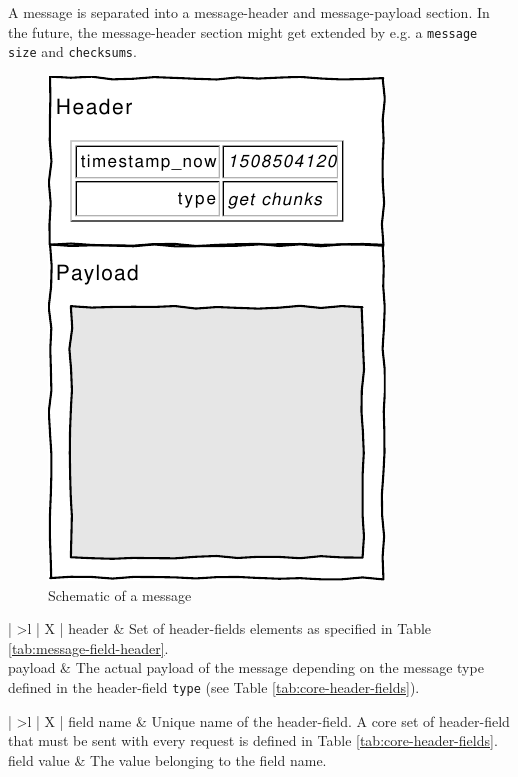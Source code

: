 A \gls{message} is separated into a \gls{message-header} and \gls{message-payload} section. In the future, the \gls{message-header} section might get extended by e.g. a \texttt{message size} and \texttt{checksums}.

\begin{figure}[h]
    \centering
    \includegraphics[width=0.3\linewidth]{resources/message_schematic}
    \caption[\Gls{message} Schematic]{Schematic of a \gls{message}}
    \label{fig:messageschematic}
\end{figure}

\begin{table}[H]
    \begin{tabu}{| >{\ttfamily}l | X |}
        \hline
        header
        & Set of \glspl{header-field} elements as specified in Table \ref{tab:message-field-header}. \\
        
        \hline
        payload
        & The actual payload of the message depending on the message type defined in the \gls{header-field} \texttt{type} (see Table \ref{tab:core-header-fields}). \\

        \hline
    \end{tabu}
    \caption[\Gls{message} Structure]{Structure of a \gls{message}.}
    \label{tab:message}
\end{table}

\begin{table}[H]
\begin{tabu}{| >{\ttfamily}l | X |}
    \hline
    field name
    & Unique name of the \gls{header-field}. A core set of \gls{header-field} that must be sent with every request is defined in Table \ref{tab:core-header-fields}. \\
    
    \hline
    field value
    & The value belonging to the field name. \\

    \hline
\end{tabu}
\caption{Structure of a \gls{header-field} element}
\label{tab:message-field-header}
\end{table}


